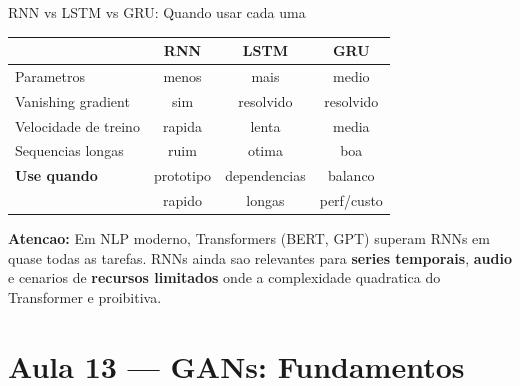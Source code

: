 \documentclass[aspectratio=169, 10pt]{beamer}
\begin{document}
\begin{frame}{RNN vs LSTM vs GRU: Quando usar cada uma}
\centering
\begin{tabular}{lccc}
\toprule
& \textbf{RNN} & \textbf{LSTM} & \textbf{GRU} \\
\midrule
Parametros & menos & mais & medio \\
Vanishing gradient & sim & resolvido & resolvido \\
Velocidade de treino & rapida & lenta & media \\
Sequencias longas & ruim & otima & boa \\
\midrule
\textbf{Use quando} & prototipo & dependencias & balanco \\
& rapido & longas & perf/custo \\
\bottomrule
\end{tabular}

\vspace{0.8em}
\begin{destaque}
  \textbf{Atencao:} Em NLP moderno, Transformers (BERT, GPT) superam RNNs em 
  quase todas as tarefas. RNNs ainda sao relevantes para \textbf{series temporais}, 
  \textbf{audio} e cenarios de \textbf{recursos limitados} onde a complexidade 
  quadratica do Transformer e proibitiva.
\end{destaque}
\end{frame}

\section{Aula 13 — GANs: Fundamentos}
\end{document}
